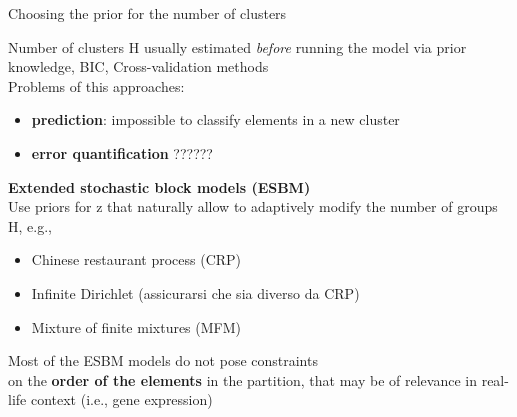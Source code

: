 \begin{frame}{Choosing the prior for the number of clusters}

Number of clusters H usually estimated \textit{before} running the model via prior knowledge, BIC, Cross-validation methods\\
Problems of this approaches: 
\begin{itemize}
    \item\textbf{prediction}: impossible to classify elements in a new cluster
    \item \textbf{error quantification} ??????
\end{itemize}
\hline 
\textbf{\alert{Extended stochastic block models (ESBM)}}\\  
Use priors for z that naturally allow to adaptively modify the number of groups H, e.g., 
\begin{itemize}
    \item Chinese restaurant process (CRP)
    \item Infinite Dirichlet (assicurarsi che sia diverso da CRP)
    \item Mixture of finite mixtures (MFM)\\
\end{itemize}

\centering
Most of the ESBM models do not pose constraints\\ on the \textbf{order of the elements} in the partition, that may be of relevance in real-life context (i.e., gene expression)
\end{frame}








